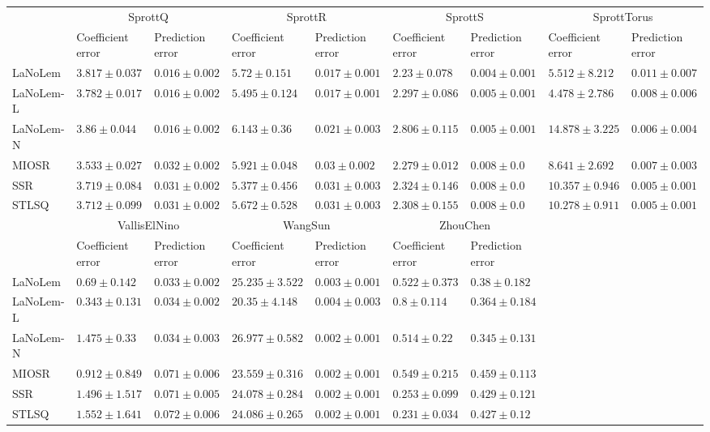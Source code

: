 \begin{table*}
{\begin{tabular}{lllllllll}
 & \multicolumn{2}{c}{SprottQ} & \multicolumn{2}{c}{SprottR} & \multicolumn{2}{c}{SprottS} & \multicolumn{2}{c}{SprottTorus} \\
 & Coefficient error & Prediction error & Coefficient error & Prediction error & Coefficient error & Prediction error & Coefficient error & Prediction error \\
\midrule
LaNoLem & $3.817\pm 0.037$ & $0.016\pm 0.002$ & $5.72\pm 0.151$ & $\mathbf{0.017}\pm 0.001$ & $\mathbf{2.23}\pm 0.078$ & $\mathbf{0.004}\pm 0.001$ & $5.512\pm 8.212$ & $0.011\pm 0.007$ \\
LaNoLem-L & $3.782\pm 0.017$ & $0.016\pm 0.002$ & $5.495\pm 0.124$ & $0.017\pm 0.001$ & $2.297\pm 0.086$ & $0.005\pm 0.001$ & $\mathbf{4.478}\pm 2.786$ & $0.008\pm 0.006$ \\
LaNoLem-N & $3.86\pm 0.044$ & $\mathbf{0.016}\pm 0.002$ & $6.143\pm 0.36$ & $0.021\pm 0.003$ & $2.806\pm 0.115$ & $0.005\pm 0.001$ & $14.878\pm 3.225$ & $0.006\pm 0.004$ \\
MIOSR & $\mathbf{3.533}\pm 0.027$ & $0.032\pm 0.002$ & $5.921\pm 0.048$ & $0.03\pm 0.002$ & $2.279\pm 0.012$ & $0.008\pm 0.0$ & $8.641\pm 2.692$ & $0.007\pm 0.003$ \\
SSR & $3.719\pm 0.084$ & $0.031\pm 0.002$ & $\mathbf{5.377}\pm 0.456$ & $0.031\pm 0.003$ & $2.324\pm 0.146$ & $0.008\pm 0.0$ & $10.357\pm 0.946$ & $0.005\pm 0.001$ \\
STLSQ & $3.712\pm 0.099$ & $0.031\pm 0.002$ & $5.672\pm 0.528$ & $0.031\pm 0.003$ & $2.308\pm 0.155$ & $0.008\pm 0.0$ & $10.278\pm 0.911$ & $\mathbf{0.005}\pm 0.001$ \\

\midrule

 & \multicolumn{2}{c}{VallisElNino} & \multicolumn{2}{c}{WangSun} & \multicolumn{2}{c}{ZhouChen} \\
 & Coefficient error & Prediction error & Coefficient error & Prediction error & Coefficient error & Prediction error \\
\midrule
LaNoLem & $0.69\pm 0.142$ & $\mathbf{0.033}\pm 0.002$ & $25.235\pm 3.522$ & $0.003\pm 0.001$ & $0.522\pm 0.373$ & $0.38\pm 0.182$ \\
LaNoLem-L & $\mathbf{0.343}\pm 0.131$ & $0.034\pm 0.002$ & $\mathbf{20.35}\pm 4.148$ & $0.004\pm 0.003$ & $0.8\pm 0.114$ & $0.364\pm 0.184$ \\
LaNoLem-N & $1.475\pm 0.33$ & $0.034\pm 0.003$ & $26.977\pm 0.582$ & $0.002\pm 0.001$ & $0.514\pm 0.22$ & $\mathbf{0.345}\pm 0.131$ \\
MIOSR & $0.912\pm 0.849$ & $0.071\pm 0.006$ & $23.559\pm 0.316$ & $0.002\pm 0.001$ & $0.549\pm 0.215$ & $0.459\pm 0.113$ \\
SSR & $1.496\pm 1.517$ & $0.071\pm 0.005$ & $24.078\pm 0.284$ & $0.002\pm 0.001$ & $0.253\pm 0.099$ & $0.429\pm 0.121$ \\
STLSQ & $1.552\pm 1.641$ & $0.072\pm 0.006$ & $24.086\pm 0.265$ & $\mathbf{0.002}\pm 0.001$ & $\mathbf{0.231}\pm 0.034$ & $0.427\pm 0.12$ \\

\bottomrule
\end{tabular}
}
\end{table*}
